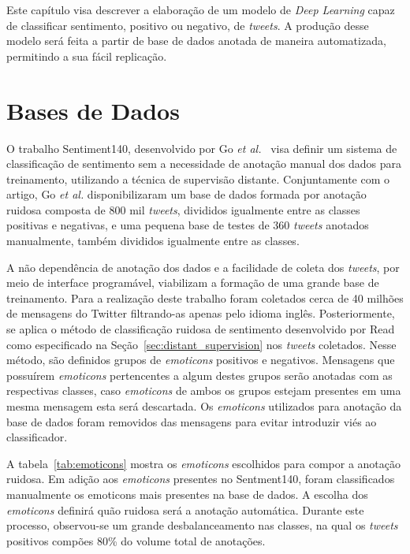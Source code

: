 Este capítulo visa descrever a elaboração de um modelo de \textit{Deep Learning} capaz de classificar sentimento,
positivo ou negativo, de \textit{tweets}.
A produção desse modelo será feita a partir de base de dados anotada de maneira automatizada, permitindo a sua
fácil replicação.

\section{Bases de Dados} \label{sec:data}

O trabalho Sentiment140, desenvolvido por Go \textit{et al.}~\cite{go09} visa definir um sistema de classificação de
sentimento sem a necessidade de anotação manual dos dados para treinamento, utilizando a técnica de supervisão distante.
Conjuntamente com o artigo, Go \textit{et al.} disponibilizaram um base de dados formada por anotação ruidosa composta
de 800 mil \textit{tweets}, divididos igualmente entre as classes positivas e negativas, e uma pequena base de testes de
360 \textit{tweets} anotados manualmente, também divididos igualmente entre as classes.

A não dependência de anotação dos dados e a facilidade de coleta dos \textit{tweets}, por meio de interface programável,
viabilizam a formação de uma grande base de treinamento.
Para a realização deste trabalho foram coletados cerca de 40 milhões de mensagens do Twitter filtrando-as apenas pelo
idioma inglês.
Posteriormente, se aplica o método de classificação ruidosa de sentimento desenvolvido por Read~\cite{read05} como
especificado na Seção~\ref{sec:distant_supervision} nos \textit{tweets} coletados.
Nesse método, são definidos grupos de \textit{emoticons} positivos e negativos.
Mensagens que possuírem \textit{emoticons} pertencentes a algum destes grupos serão anotadas com as respectivas classes,
caso \textit{emoticons} de ambos os grupos estejam presentes em uma mesma mensagem esta será descartada.
Os \textit{emoticons} utilizados para anotação da base de dados foram removidos das mensagens para evitar introduzir
viés ao classificador.

A tabela~\ref{tab:emoticons} mostra os \textit{emoticons} escolhidos para compor a anotação ruidosa.
Em adição aos \textit{emoticons} presentes no Sentment140, foram classificados manualmente os emoticons mais presentes
na base de dados.
A escolha dos \textit{emoticons} definirá quão ruidosa será a anotação automática.
Durante este processo, observou-se um grande desbalanceamento nas classes, na qual os \textit{tweets} positivos
compões 80\% do volume total de anotações.

